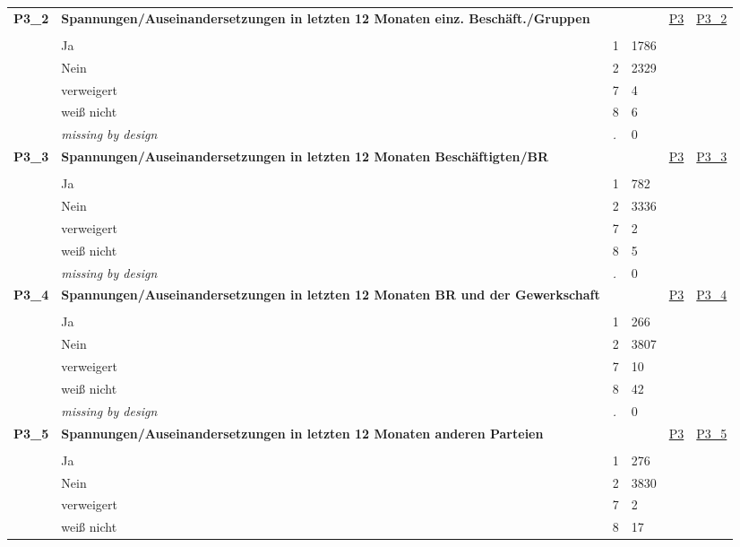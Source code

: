 \begin{longtable}{| L{2.45cm} | L{6cm} | C{1.5cm} | R{1cm} | C{2.25cm} | C{2.25cm} |}
\textbf{P3\_2}\label{var:P3:2} & \textbf{Spannungen/Auseinandersetzungen in letzten 12 Monaten einz. Beschäft./Gruppen} &  &  & \hyperref[P3]{P3} & \hyperref[var:suf:P3:2]{P3\_2} \\ 
   &  &  &  &  &  \\ 
   & Ja & 1 & 1786 &  &  \\ 
   & Nein & 2 & 2329 &  &  \\ 
   & verweigert & 7 & 4 &  &  \\ 
   & weiß nicht & 8 & 6 &  &  \\ 
   & \textit{missing by design} & \textit{.} & 0 &  &  \\ 
   \midrule
\textbf{P3\_3}\label{var:P3:3} & \textbf{Spannungen/Auseinandersetzungen in letzten 12 Monaten Beschäftigten/BR} &  &  & \hyperref[P3]{P3} & \hyperref[var:suf:P3:3]{P3\_3} \\ 
   &  &  &  &  &  \\ 
   & Ja & 1 & 782 &  &  \\ 
   & Nein & 2 & 3336 &  &  \\ 
   & verweigert & 7 & 2 &  &  \\ 
   & weiß nicht & 8 & 5 &  &  \\ 
   & \textit{missing by design} & \textit{.} & 0 &  &  \\ 
   \midrule
\textbf{P3\_4}\label{var:P3:4} & \textbf{Spannungen/Auseinandersetzungen in letzten 12 Monaten BR und der Gewerkschaft} &  &  & \hyperref[P3]{P3} & \hyperref[var:suf:P3:4]{P3\_4} \\ 
   &  &  &  &  &  \\ 
   & Ja & 1 & 266 &  &  \\ 
   & Nein & 2 & 3807 &  &  \\ 
   & verweigert & 7 & 10 &  &  \\ 
   & weiß nicht & 8 & 42 &  &  \\ 
   & \textit{missing by design} & \textit{.} & 0 &  &  \\ 
   \midrule
\textbf{P3\_5}\label{var:P3:5} & \textbf{Spannungen/Auseinandersetzungen in letzten 12 Monaten anderen Parteien} &  &  & \hyperref[P3]{P3} & \hyperref[var:suf:P3:5]{P3\_5} \\ 
   &  &  &  &  &  \\ 
   & Ja & 1 & 276 &  &  \\ 
   & Nein & 2 & 3830 &  &  \\ 
   & verweigert & 7 & 2 &  &  \\ 
   & weiß nicht & 8 & 17 &  &  \\ 

\end{longtable}
